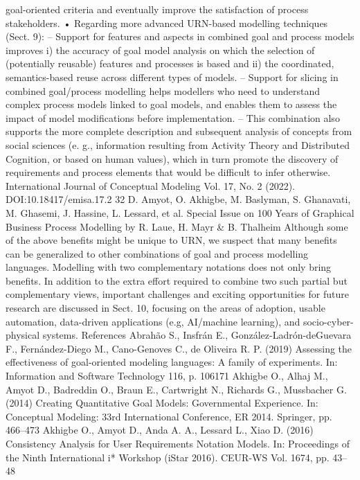 goal-oriented criteria and eventually improve
the satisfaction of process stakeholders.
• Regarding more advanced URN-based modelling techniques (Sect. 9):
– Support for features and aspects in combined
goal and process models improves i) the accuracy of goal model analysis on which the
selection of (potentially reusable) features
and processes is based and ii) the coordinated, semantics-based reuse across different
types of models.
– Support for slicing in combined goal/process modelling helps modellers who need to
understand complex process models linked
to goal models, and enables them to assess
the impact of model modifications before
implementation.
– This combination also supports the more
complete description and subsequent analysis
of concepts from social sciences (e. g., information resulting from Activity Theory and
Distributed Cognition, or based on human
values), which in turn promote the discovery
of requirements and process elements that
would be difficult to infer otherwise.
International Journal of Conceptual Modeling
Vol. 17, No. 2 (2022). DOI:10.18417/emisa.17.2
32 D. Amyot, O. Akhigbe, M. Baslyman, S. Ghanavati, M. Ghasemi, J. Hassine, L. Lessard, et al.
Special Issue on 100 Years of Graphical Business Process Modelling by R. Laue, H. Mayr & B. Thalheim
Although some of the above benefits might be
unique to URN, we suspect that many benefits
can be generalized to other combinations of goal
and process modelling languages. Modelling with
two complementary notations does not only bring
benefits. In addition to the extra effort required
to combine two such partial but complementary
views, important challenges and exciting opportunities for future research are discussed in Sect. 10,
focusing on the areas of adoption, usable automation, data-driven applications (e.g, AI/machine
learning), and socio-cyber-physical systems.
References
Abrahão S., Insfrán E., González-Ladrón-deGuevara F., Fernández-Diego M., Cano-Genoves
C., de Oliveira R. P. (2019) Assessing the effectiveness of goal-oriented modeling languages: A
family of experiments. In: Information and Software Technology 116, p. 106171
Akhigbe O., Alhaj M., Amyot D., Badreddin O.,
Braun E., Cartwright N., Richards G., Mussbacher
G. (2014) Creating Quantitative Goal Models:
Governmental Experience. In: Conceptual Modeling: 33rd International Conference, ER 2014.
Springer, pp. 466–473
Akhigbe O., Amyot D., Anda A. A., Lessard L.,
Xiao D. (2016) Consistency Analysis for User
Requirements Notation Models. In: Proceedings
of the Ninth International i* Workshop (iStar
2016). CEUR-WS Vol. 1674, pp. 43–48
